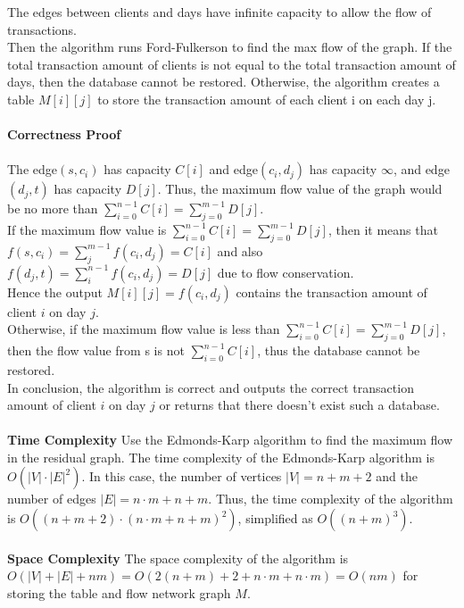\documentclass[11pt]{exam}
\begin{document}
The edges between clients and days have infinite capacity to allow the flow of transactions.\\
\indent Then the algorithm runs Ford-Fulkerson to find the max flow of the graph. If the total transaction amount of clients is not equal to the total transaction amount of days, then the database cannot be restored. 
Otherwise, the algorithm creates a table $M[i][j]$ to store the transaction amount of each client i on each day j.\\
\\
\textbf{Correctness Proof} \\
\\
\indent The edge$(s,c_i)$ has capacity $C[i]$ and edge$(c_i,d_j)$ has capacity $\infty$, and edge$(d_j,t)$ has capacity $D[j]$. Thus, the maximum flow value of the graph would be no more than $\sum_{i=0}^{n-1} C[i] = \sum_{j=0}^{m-1} D[j]$.\\
\indent If the maximum flow value is $\sum_{i=0}^{n-1} C[i] = \sum_{j=0}^{m-1} D[j]$, then it means that $f(s,c_i) = \sum_{j}^{m-1} f(c_i,d_j) = C[i]$ and also $f(d_j,t) = \sum_{i}^{n-1} f(c_i,d_j) = D[j]$ due to flow conservation.\\
\indent Hence the output $M[i][j]=f(c_i, d_j)$ contains the transaction amount of client $i$ on day $j$. \\
\indent Otherwise, if the maximum flow value is less than $\sum_{i=0}^{n-1} C[i] = \sum_{j=0}^{m-1} D[j]$, then the flow value from s is not $\sum_{i=0}^{n-1} C[i]$, thus the database cannot be restored.\\
\indent In conclusion, the algorithm is correct and outputs the correct transaction amount of client $i$ on day $j$ or returns that there doesn't exist such a database.\\
\\
\textbf{Time Complexity}
Use the Edmonds-Karp algorithm to find the maximum flow in the residual graph. The time complexity of the Edmonds-Karp algorithm is $O(|V|\cdot|E|^2)$. In this case, the number of vertices $|V|=n+m+2$ and the number of edges $|E|=n\cdot m+n+m$. Thus, the time complexity of the algorithm is $O((n+m+2)\cdot(n\cdot m+n+m)^2)$, simplified as $O((n+m)^3)$.\\
\\
\textbf{Space Complexity}
The space complexity of the algorithm is $O(|V|+|E|+nm)=O(2(n+m)+2+n\cdot m+n\cdot m)=O(nm)$ for storing the table and flow network graph $M$.
\end{document}
